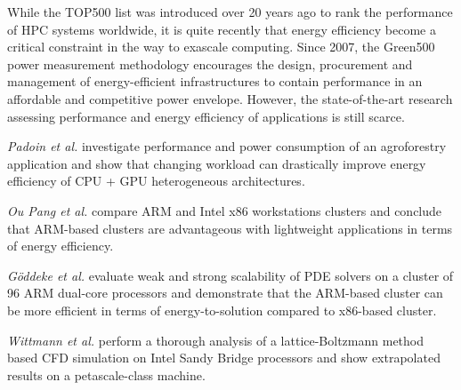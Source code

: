 While the  TOP500 list was  introduced over 20  years ago to  rank the
performance of HPC systems worldwide, it is quite recently that energy
efficiency  become  a  critical  constraint  in the  way  to  exascale
computing.   Since 2007,  the Green500  power  measurement methodology
encourages the design,  procurement and management of energy-efficient
infrastructures   to  contain   performance  in   an   affordable  and
competitive  power envelope.   However, the  state-of-the-art research
assessing performance  and energy efficiency of  applications is still
scarce.

\emph{Padoin et al.}   \cite{Padoin-2013} investigate performance and
power  consumption  of  an  agroforestry  application  and  show  that
changing workload  can drastically improve energy efficiency  of CPU +
GPU heterogeneous architectures.

\emph{Ou  Pang et  al.}   \cite{Ou-2012} compare  ARM  and Intel  x86
workstations  clusters  and   conclude  that  ARM-based  clusters  are
advantageous  with   lightweight  applications  in   terms  of  energy
efficiency.

\emph{G\"oddeke et al.}  \cite{Goddeke-2013} evaluate weak and strong
scalability of PDE solvers on a cluster of 96 ARM dual-core processors
and demonstrate  that the ARM-based  cluster can be more  efficient in
terms of energy-to-solution compared to x86-based cluster.

\emph{Wittmann  et  al.}   \cite{Wittmann-2013}  perform  a  thorough
analysis of  a lattice-Boltzmann method based CFD  simulation on Intel
Sandy   Bridge  processors   and  show   extrapolated  results   on  a
petascale-class machine.

